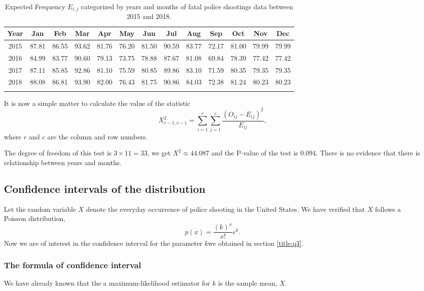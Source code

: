 \documentclass[conf]{new-aiaa}
\begin{document}
\begin{table}[!htbp]
\centering
\begin{tabular}{c|cccccccccccc}
\toprule 
\toprule
Year & Jan & Feb & Mar & Apr & May & Jun & Jul & Aug & Sep & Oct & Nov & Dec \\
\hline
2015 & 87.81 & 86.55 & 93.62 & 81.76 & 76.20 & 81.50 & 90.59 & 83.77 & 72.17 & 81.00 & 79.99 & 79.99 \\
2016 & 84.99 & 83.77 & 90.60 & 79.13 & 73.75 & 78.88 & 87.67 & 81.08 & 69.84 & 78.39 & 77.42 & 77.42 \\
2017 & 87.11 & 85.85 & 92.86 & 81.10 & 75.59 & 80.85 & 89.86 & 83.10 & 71.59 & 80.35 & 79.35 & 79.35 \\
2018 & 88.08 & 86.81 & 93.90 & 82.00 & 76.43 & 81.75 & 90.86 & 84.03 & 72.38 & 81.24 & 80.23 & 80.23 \\
\bottomrule 
\bottomrule\noalign{\bigskip}
\end{tabular}
\caption{Expected Frequency $E_{i,j}$ categorized by years and months of fatal police shootings data between 2015 and 2018.}
\label{tab:q4-year-month-exp}
\end{table}

It is now a simple matter to calculate the value of the statistic
$$X^2_{r-1,c-1}=\sum_{i=1}^r\sum_{j=1}^c\frac{(O_{ij}-E_{ij})^2}{E_{ij}},$$
where $r$ and $c$ are the column and row numbers. \medskip

The degree of freedom of this test is $3\times11=33$, we get $X^2\approx44.087$ and the P-value of the test is $0.094$. There is no evidence that there is relationship between years and months.



\subsection{Confidence intervals of the distribution}

Let the random variable $X$ denote the everyday occurrence of police shooting in the United States. We have verified that $X$ follows a Poisson distribution, $$p(x)=\frac{(k)^{x}}{x !} e^{k}.$$ 
Now we are of interest in the confidence interval for the parameter $k$we obtained in section \ref{title:q3}.

\subsubsection{The formula of confidence interval}

We have already known that the a maximum-likelihood estimator for $k$ is the sample mean, $\overline{X}$. \medskip
\end{document}
